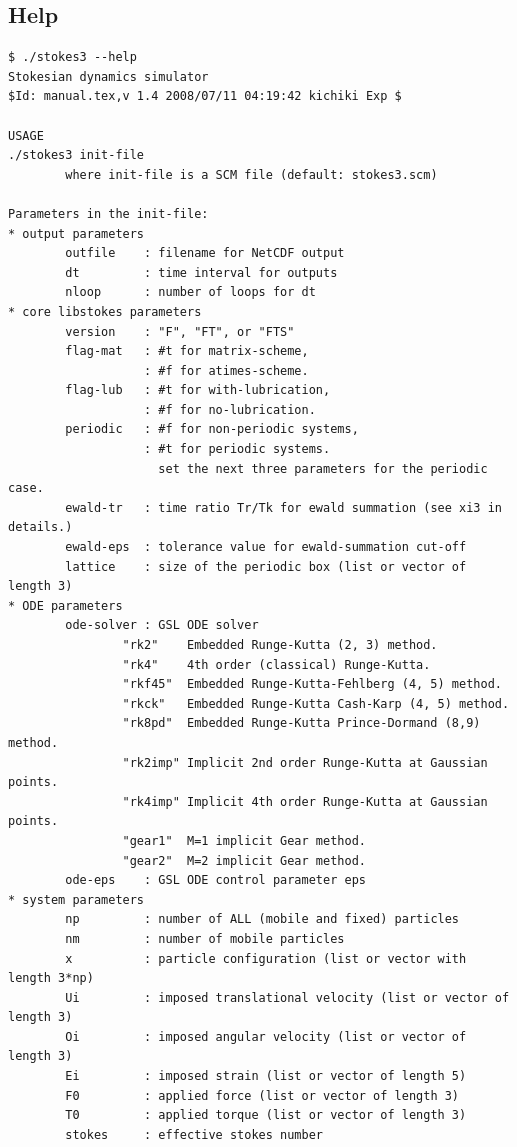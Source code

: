 \documentclass{book}
\begin{document}
\subsection{Help}
{\small
\begin{verbatim}
$ ./stokes3 --help
Stokesian dynamics simulator
$Id: manual.tex,v 1.4 2008/07/11 04:19:42 kichiki Exp $

USAGE
./stokes3 init-file
        where init-file is a SCM file (default: stokes3.scm)

Parameters in the init-file:
* output parameters
        outfile    : filename for NetCDF output
        dt         : time interval for outputs
        nloop      : number of loops for dt
* core libstokes parameters
        version    : "F", "FT", or "FTS"
        flag-mat   : #t for matrix-scheme,
                   : #f for atimes-scheme.
        flag-lub   : #t for with-lubrication,
                   : #f for no-lubrication.
        periodic   : #f for non-periodic systems,
                   : #t for periodic systems.
                     set the next three parameters for the periodic case.
        ewald-tr   : time ratio Tr/Tk for ewald summation (see xi3 in details.)
        ewald-eps  : tolerance value for ewald-summation cut-off
        lattice    : size of the periodic box (list or vector of length 3)
* ODE parameters
        ode-solver : GSL ODE solver
                "rk2"    Embedded Runge-Kutta (2, 3) method.
                "rk4"    4th order (classical) Runge-Kutta.
                "rkf45"  Embedded Runge-Kutta-Fehlberg (4, 5) method.
                "rkck"   Embedded Runge-Kutta Cash-Karp (4, 5) method.
                "rk8pd"  Embedded Runge-Kutta Prince-Dormand (8,9) method.
                "rk2imp" Implicit 2nd order Runge-Kutta at Gaussian points.
                "rk4imp" Implicit 4th order Runge-Kutta at Gaussian points.
                "gear1"  M=1 implicit Gear method.
                "gear2"  M=2 implicit Gear method.
        ode-eps    : GSL ODE control parameter eps
* system parameters
        np         : number of ALL (mobile and fixed) particles
        nm         : number of mobile particles
        x          : particle configuration (list or vector with length 3*np)
        Ui         : imposed translational velocity (list or vector of length 3)
        Oi         : imposed angular velocity (list or vector of length 3)
        Ei         : imposed strain (list or vector of length 5)
        F0         : applied force (list or vector of length 3)
        T0         : applied torque (list or vector of length 3)
        stokes     : effective stokes number

\end{verbatim}}
\end{document}
